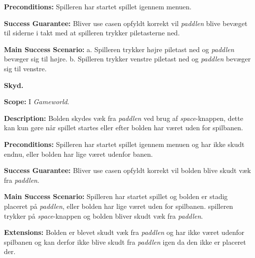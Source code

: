 \textbf{Preconditions:}\newline
Spilleren har startet spillet igennem menuen.\newline

\textbf{Success Guarantee:}\newline
Bliver use casen opfyldt korrekt vil \textit{paddlen} blive bevæget til siderne i takt med at spilleren trykker piletasterne ned.\newline

\textbf{Main Success Scenario:}\newline
 a. Spilleren trykker højre piletast ned og \textit{paddlen} bevæger sig til højre.\newline
 b. Spilleren trykker venstre piletast ned og \textit{paddlen} bevæger sig til venstre.\newline \newline


\textbf{Skyd.}\newline

\textbf{Scope:}\newline
I \textit{Gameworld}.\newline

\textbf{Description:} \newline
Bolden skydes væk fra \textit{paddlen} ved brug af \textit{space}-knappen, dette kan kun gøre når spillet startes eller efter bolden har været uden for spilbanen. \newline

\textbf{Preconditions:}\newline
Spilleren har startet spillet igennem menuen og har ikke skudt endnu, eller bolden har lige været udenfor banen.\newline

\textbf{Success Guarantee:}\newline
Bliver use casen opfyldt korrekt vil bolden blive skudt væk fra \textit{paddlen}.\newline

\textbf{Main Success Scenario:}\newline
Spilleren har startet spillet og bolden er stadig placeret på \textit{paddlen}, eller bolden har lige været uden for spilbanen. spilleren trykker på \textit{space}-knappen og bolden bliver skudt væk fra \textit{paddlen}.\newline

\textbf{Extensions:}\newline
Bolden er blevet skudt væk fra \textit{paddlen} og har ikke været udenfor spilbanen og kan derfor ikke blive skudt fra \textit{paddlen} igen da den ikke er placeret der.\newline \newline


